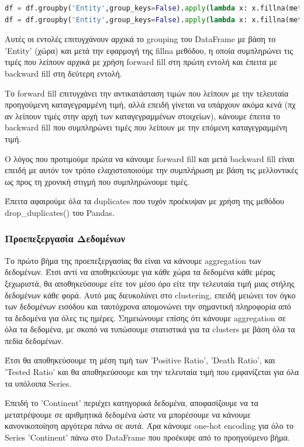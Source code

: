 \documentclass[12pt,a4paper]{article}
\begin{document}
\begin{lstlisting}[language=Python]
df = df.groupby('Entity',group_keys=False).apply(lambda x: x.fillna(method='ffill'))
df = df.groupby('Entity',group_keys=False).apply(lambda x: x.fillna(method='bfill'))
\end{lstlisting}

Αυτές οι εντολές επιτυγχάνουν αρχικά το grouping του DataFrame με βάση το 'Entity' (χώρα) και μετά την εφαρμογή της fillna μεθόδου, η οποία συμπληρώνει τις τιμές που λείπουν αρχικά με χρήση forward fill στη πρώτη εντολή και έπειτα με backward fill στη δεύτερη εντολή.

Το forward fill επιτυγχάνει την αντικατάσταση τιμών που λείπουν με την τελευταία προηγούμενη καταγεγραμμένη τιμή, αλλά επειδή γίνεται να υπάρχουν ακόμα κενά (πχ αν λείπουν τιμές στην αρχή των καταγεγραμμένων στοιχείων), κάνουμε έπειτα το backward fill που συμπληρώνει τιμές που λείπουν με την επόμενη καταγεγραμμένη τιμή.

Ο λόγος που προτιμούμε πρώτα να κάνουμε forward fill και μετά backward fill είναι επειδή με αυτόν τον τρόπο ελαχιστοποιούμε την συμπλήρωση με βάση τις μελλοντικές ως προς τη χρονική στιγμή που συμπληρώνουμε τιμές.

Έπειτα αφαιρούμε όλα τα duplicates που τυχόν προέκυψαν με χρήση της μεθόδου drop\_duplicates() του Pandas.

\subsubsection{Προεπεξεργασία Δεδομένων}

Το πρώτο βήμα της προεπεξεργασίας θα είναι να κάνουμε aggregation των δεδομένων. Έτσι αντί να αποθηκεύουμε για κάθε χώρα τα δεδομένα κάθε μέρας ξεχωριστά, θα αποθηκεύσουμε είτε τον μέσο όρο είτε την τελευταία τιμή μιας στήλης δεδομένων κάθε φορά. Αυτό μας διευκολύνει στο clustering, επειδή μειώνει τον όγκο των δεδομένων εισόδου και ταυτόχρονα απομονώνει την σημαντική πληροφορία από τα δεδομένα για όλες τις ημέρες. Σημειώνουμε επίσης ότι κάνουμε aggregation σε όλα τα δεδομένα, με σκοπό να τυπώσουμε στατιστικά για τα clusters με βάση όλα τα πεδία δεδομένων.

Έτσι θα αποθηκεύσουμε τη μέση τιμή των 'Positive Ratio', 'Death Ratio', και 'Tested Ratio' και θα αποθηκεύσουμε και την τελευταία τιμή που εμφανίζεται για όλα τα υπόλοιπα Series.

Επειδή το 'Continent' περιέχει κατηγορικά δεδομένα, αποφασίζουμε να τα μετατρέψουμε σε αριθμητικά δεδομένα ώστε να μπορέσουμε να κάνουμε κανονικοποίηση αργότερα πάνω σε αυτά. Άρα κάνουμε one-hot encoding για όλο το Series 'Continent' πάνω στο DataFrame που προέκυψε από το προηγούμενο βήμα.
\end{document}
